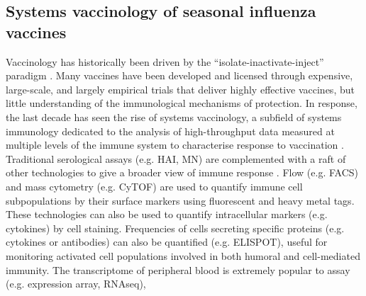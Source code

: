 \subsection{Systems vaccinology of seasonal influenza vaccines}
\label{subsec:hird_dge_intro_systemsVaccFlu}

Vaccinology has historically been driven by the \enquote{isolate-inactivate-inject} paradigm \autocite{degregorio2014EmpiricismRationalDesign}.
Many vaccines have been developed and licensed through expensive, large-scale, and largely empirical trials that deliver highly effective vaccines, 
but little understanding of the immunological mechanisms of protection.
In response, the last decade has seen the rise of systems vaccinology, 
a subfield of systems immunology dedicated to the analysis of high-throughput data measured at multiple levels of the immune system to characterise response to vaccination
\autocite{pulendran2010SystemsVaccinology,nakaya2012SystemsVaccinologyLearning,li2013SystemsBiologicalApproaches,pulendran2014SystemsVaccinologyProbing,hagan2015SystemsVaccinologyEnabling,nakaya2015VaccinologyEraHighthroughput,davis2018WillSystemsBiology,raeven2019SystemsVaccinologyBig}.
Traditional serological assays (e.g. \gls{HAI}, \gls{MN}) are complemented with a raft of other technologies to give a broader view of immune response \autocite{nakaya2012SystemsVaccinologyLearning,li2013SystemsBiologicalApproaches,pulendran2014SystemsVaccinologyProbing,davis2018WillSystemsBiology,raeven2019SystemsVaccinologyBig}.
Flow (e.g. \gls{FACS}) and mass cytometry (e.g. \gls{CyTOF}) are used to quantify immune cell subpopulations by their surface markers using fluorescent and heavy metal tags.
These technologies can also be used to quantify intracellular markers (e.g. cytokines) by cell staining.
Frequencies of cells secreting specific proteins (e.g. cytokines or antibodies) can also be quantified (e.g. \gls{ELISPOT}), useful for monitoring activated cell populations involved in both humoral and cell-mediated immunity.
The transcriptome of peripheral blood is extremely popular to assay (e.g. expression array, \gls{RNAseq}), 

